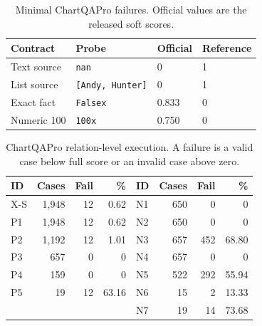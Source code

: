 \begin{table}[H]
\centering
\caption{Minimal ChartQAPro failures. Official values are the released soft scores.}
\label{tab:chartqapro-minimal}
\scriptsize
\setlength{\tabcolsep}{3.2pt}
\begin{tabular}{llll}
\toprule
Contract & Probe & Official & Reference\\
\midrule
Text source & \texttt{nan} & 0 & 1\\
List source & \texttt{[Andy, Hunter]} & 0 & 1\\
Exact fact & \texttt{Falsex} & 0.833 & 0\\
Numeric 100 & \texttt{100x} & 0.750 & 0\\
\bottomrule
\end{tabular}
\end{table}

\begin{table}[H]
\centering
\caption{ChartQAPro relation-level execution. A failure is a valid case below full score or an invalid case above zero.}
\label{tab:chartqapro-relation-results}
\scriptsize
\setlength{\tabcolsep}{2.8pt}
\begin{tabular}{lrrr@{\hspace{8pt}}lrrr}
\toprule
ID & Cases & Fail & \% & ID & Cases & Fail & \%\\
\midrule
X-S & 1,948 & 12 & 0.62 & N1 & 650 & 0 & 0\\
P1 & 1,948 & 12 & 0.62 & N2 & 650 & 0 & 0\\
P2 & 1,192 & 12 & 1.01 & N3 & 657 & 452 & 68.80\\
P3 & 657 & 0 & 0 & N4 & 657 & 0 & 0\\
P4 & 159 & 0 & 0 & N5 & 522 & 292 & 55.94\\
P5 & 19 & 12 & 63.16 & N6 & 15 & 2 & 13.33\\
 & & & & N7 & 19 & 14 & 73.68\\
\bottomrule
\end{tabular}
\end{table}

